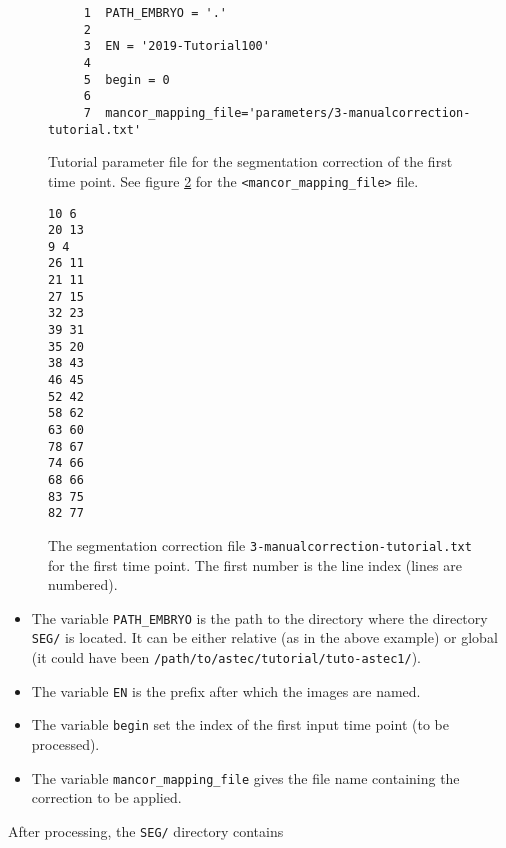 \begin{figure}
\begin{framed}
\begin{verbatim}
     1	PATH_EMBRYO = '.'
     2	
     3	EN = '2019-Tutorial100'
     4	
     5	begin = 0
     6	
     7	mancor_mapping_file='parameters/3-manualcorrection-tutorial.txt'
\end{verbatim}
\end{framed}
\caption{\label{fig:tutorial:parameter:manual:correction} Tutorial
  parameter file for the segmentation correction of the first time
  point. See figure
  \protect\ref{fig:tutorial:parameter:manual:correction:file} for the
  \texttt{<mancor\_mapping\_file>} file.}
\end{figure}

\begin{figure}
\begin{framed}
\begin{verbatim}
10 6
20 13
9 4
26 11
21 11
27 15
32 23
39 31
35 20
38 43
46 45
52 42
58 62
63 60
78 67
74 66
68 66
83 75
82 77
\end{verbatim}
\end{framed}
\caption{\label{fig:tutorial:parameter:manual:correction:file}
  The segmentation correction file
  \texttt{3-manualcorrection-tutorial.txt} for the first time point. The first
  number is the line index (lines are numbered).}
\end{figure}

\begin{itemize}
  \itemsep -0.5ex
  \item The variable \texttt{PATH\_EMBRYO} is the path to the directory where
    the directory \texttt{SEG/} is located. It can be either relative (as in the
    above example) or
    global (it could have been \texttt{/path/to/astec/tutorial/tuto-astec1/}).
  \item The variable \texttt{EN} is the prefix after which the  images
    are named. 
  \item The variable \texttt{begin} set  the
    index of the first input time point (to be processed).
  \item The variable \texttt{mancor\_mapping\_file} gives the file
    name containing the correction to be applied.
\end{itemize}

After processing, the \texttt{SEG/} directory contains

\mbox{}
\mbox{}

